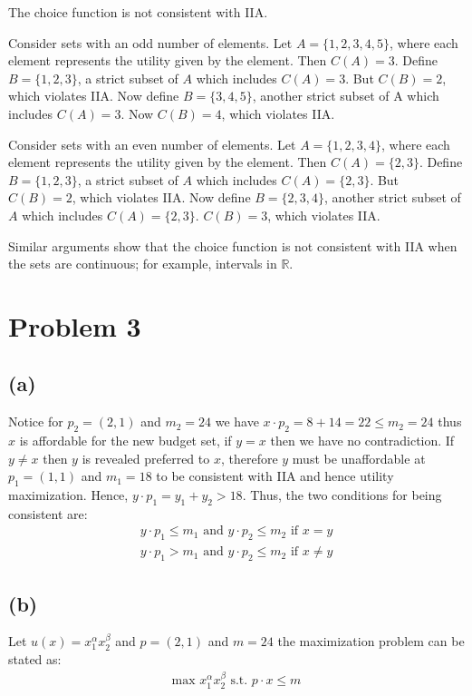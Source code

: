 \documentclass{article}
\begin{document}
\begin{itshape}
The choice function is not consistent with IIA.

Consider sets with an odd number of elements. Let $A = \{1, 2, 3, 4, 5\}$, where each element represents the utility given by the element. Then $C(A) = 3$. Define $B = \{1, 2, 3\}$, a strict subset of $A$ which includes $C(A) = 3$. But $C(B) = 2$, which violates IIA. Now define $B = \{3, 4 ,5\}$, another strict subset of A which includes $C(A) = 3$. Now $C(B) = 4$, which violates IIA.

Consider sets with an even number of elements. Let $A = \{1, 2, 3, 4\}$, where each element represents the utility given by the element. Then $C(A) = \{2, 3\}$. Define $B = \{1, 2, 3\}$, a strict subset of $A$ which includes $C(A) = \{2, 3\}$. But $C(B) = 2$, which violates IIA. Now define $B = \{2, 3, 4\}$, another strict subset of $A$ which includes $C(A) = \{2, 3\}$. $C(B) = 3$, which violates IIA.

Similar arguments show that the choice function is not consistent with IIA when the sets are continuous; for example, intervals in $\mathbb{R}$.
\end{itshape}



\section*{Problem 3} %
\subsection*{(a)}
Notice for $p_2=(2,1)$ and $m_2=24$ we have $x\cdot p_2=8+14=22\leq m_2=24$ thus $x$ is affordable for the new budget set, if $y=x$ then we have no contradiction. If $y\neq x$ then $y$ is revealed preferred to $x$, therefore $y$ must be unaffordable at $p_1=(1,1)$ and $m_1=18$ to be consistent with IIA and hence utility maximization. Hence, $y\cdot p_1=y_1+y_2>18$. Thus, the two conditions for being consistent are:
\begin{gather*}
   y\cdot p_1\leq m_1 \text{ and } y\cdot p_2\leq m_2  \text{ if } x=y \\
   y \cdot p_1>m_1  \text{ and } y\cdot p_2 \leq m_2 \text{ if } x\neq y
\end{gather*}

\subsection*{(b)}
Let $u(x)=x_1^\alpha x_2^\beta$ and $p=(2,1)$ and $m=24$ the maximization problem can be stated as:
\begin{gather*}
    \text{max } x_1^\alpha x_2^\beta \text{ s.t. } p\cdot x \leq m
\end{gather*}
\end{document}
